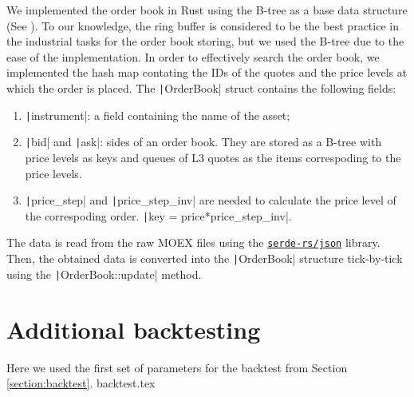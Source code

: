 \begin{appendices}
        We implemented the order book in Rust using the B-tree as a base data structure (See \Cite{Cormen2022}). To our knowledge, 
        the ring buffer is considered to be the best practice in the industrial tasks for the order book storing, but we used 
        the B-tree due to the ease of the implementation.
        In order to effectively search the order book, we implemented the hash map contating the IDs of the quotes and
        the price levels at which the order is placed. The \texttt|OrderBook| struct contains the following fields:
        \begin{enumerate}
            \item \texttt|instrument|: a field containing the name of the asset;
            \item \texttt|bid| and \texttt|ask|: sides of an order book. They are 
                stored as a B-tree with price levels as keys and queues of L3 quotes as the items correspoding
                to the price levels.
            \item \texttt|price_step| and \texttt|price_step_inv| are needed to calculate the 
                price level of the correspoding order. \texttt|key = price*price_step_inv|.
        \end{enumerate}
        The data is read from the raw MOEX files using the \href{github.com/serde-rs/json}{\texttt{serde-rs/json}} library. Then, the obtained data is
        converted into the \texttt|OrderBook| structure tick-by-tick using the \texttt|OrderBook::update| method.

    \section{Additional backtesting}\label{appendix:backtest}
        Here we used the first set of parameters for the backtest from Section \ref{section:backtest}.
        {backtest.tex}
\end{appendices}   %